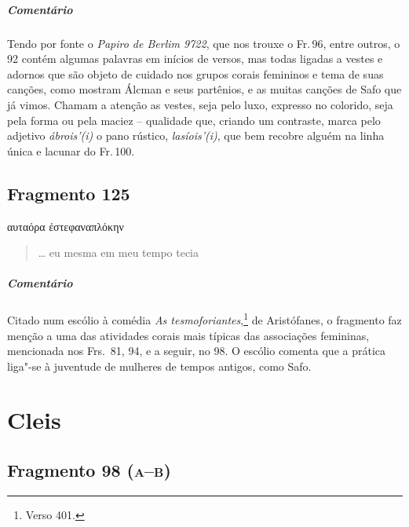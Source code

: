 {\medskip

{\paragraph{Comentário} Tendo por fonte o \textit{Papiro de Berlim 9722}, que nos trouxe o Fr.\,96, entre outros, o 92 contém algumas palavras em inícios de versos, mas todas ligadas a vestes e adornos que são objeto de cuidado nos grupos corais femininos e tema de suas canções, como mostram Álcman e seus partênios, e as muitas canções de Safo que já vimos. Chamam a atenção as vestes, seja pelo luxo, expresso no colorido, seja pela forma ou pela maciez -- qualidade que, criando um contraste, marca pelo adjetivo \textit{ábrois'(i)} o pano rústico, \textit{lasíois'(i)}, que bem recobre alguém na linha única e lacunar do Fr.\,100.}



\section{Fragmento 125}

\begin{gkverse}
\dagger{}αυταόρα\dagger{} ἐστεφαναπλόκην
\end{gkverse}

\begin{verse}
\ldots{} eu mesma em meu tempo tecia 
\end{verse}

\medskip

{\paragraph{Comentário} Citado num escólio à comédia \textit{As tesmoforiantes},\footnote{Verso 401.} de Aristófanes, o fragmento faz menção a uma das atividades corais mais típicas das associações femininas, mencionada nos Frs.~81, 94, e a seguir, no 98. O escólio comenta que a prática liga"-se à juventude de mulheres de tempos antigos, como Safo.}



\chapter{Cleis}

\section{Fragmento 98 (\textsc{a--b})}

}
